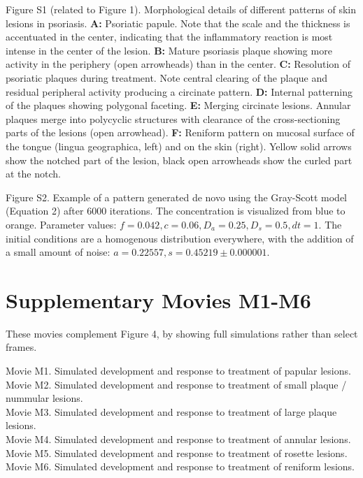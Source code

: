 Figure S1 (related to Figure 1). Morphological details of different patterns of skin lesions in psoriasis. \textbf{A:} Psoriatic papule. Note that the scale and the thickness is accentuated in the center, indicating that the inflammatory reaction is most intense in the center of the lesion. \textbf{B:} Mature psoriasis plaque showing more activity in the periphery (open arrowheads) than in the center. \textbf{C:} Resolution of psoriatic plaques during treatment. Note central clearing of the plaque and residual peripheral activity producing a circinate pattern. \textbf{D:} Internal patterning of the plaques showing polygonal faceting. \textbf{E:} Merging circinate lesions. Annular plaques merge into polycyclic structures with clearance of the cross-sectioning parts of the lesions (open arrowhead). \textbf{F:} Reniform pattern on mucosal surface of the tongue (lingua geographica, left) and on the skin (right). Yellow solid arrows show the notched part of the lesion, black open arrowheads show the curled part at the notch.

Figure S2. Example of a pattern generated de novo using the Gray-Scott model (Equation 2) after 6000 iterations. The concentration is visualized from blue to orange. Parameter values: $f=0.042, c=0.06,  D_a=0.25, D_s=0.5, dt=1$. The initial conditions are a homogenous distribution everywhere, with the addition of a small amount of noise: $a=0.22557, s=0.45219±0.000001$.

\section{Supplementary Movies M1-M6}
These movies complement Figure 4, by showing full simulations rather than select frames.

Movie M1. Simulated development and response to treatment of papular lesions. \\
Movie M2. Simulated development and response to treatment of small plaque / nummular lesions. \\
Movie M3. Simulated development and response to treatment of large plaque lesions. \\
Movie M4. Simulated development and response to treatment of annular lesions. \\
Movie M5. Simulated development and response to treatment of rosette lesions. \\
Movie M6. Simulated development and response to treatment of reniform lesions.